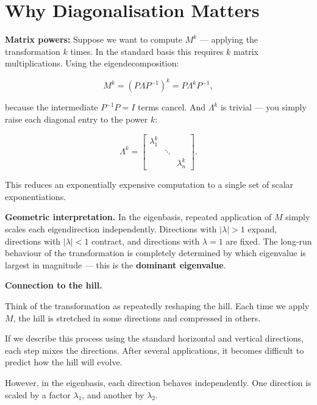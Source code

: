 \documentclass[11pt,openany]{book}
\theoremstyle{definition}
\begin{document}
\section{Why Diagonalisation Matters}

\textbf{Matrix powers:} Suppose we want to compute $M^k$ --- applying the 
transformation $k$ times. In the standard basis this requires $k$ matrix 
multiplications. Using the eigendecomposition:

\[
M^k = (P\Lambda P^{-1})^k = P \Lambda^k P^{-1},
\]

because the intermediate $P^{-1}P = I$ terms cancel. And $\Lambda^k$ is trivial 
--- you simply raise each diagonal entry to the power $k$:

\[
\Lambda^k = \begin{bmatrix} \lambda_1^k & & \\ & \ddots & \\ & & \lambda_n^k \end{bmatrix}.
\]

This reduces an exponentially expensive computation to a single set of scalar 
exponentiations.

\medskip

\textbf{Geometric interpretation.} In the eigenbasis, repeated application of $M$ 
simply scales each eigendirection independently. Directions with $|\lambda| > 1$ 
expand, directions with $|\lambda| < 1$ contract, and directions with $\lambda = 1$ 
are fixed. The long-run behaviour of the transformation is completely determined by 
which eigenvalue is largest in magnitude --- this is the \textbf{dominant eigenvalue}.

\medskip

\textbf{Connection to the hill.}

\medskip

Think of the transformation as repeatedly reshaping the hill. Each time we apply $M$, 
the hill is stretched in some directions and compressed in others.

\medskip

If we describe this process using the standard horizontal and vertical directions, 
each step mixes the directions. After several applications, it becomes difficult to 
predict how the hill will evolve.

\medskip

However, in the eigenbasis, each direction behaves independently. One direction 
is scaled by a factor $\lambda_1$, and another by $\lambda_2$.
\end{document}
